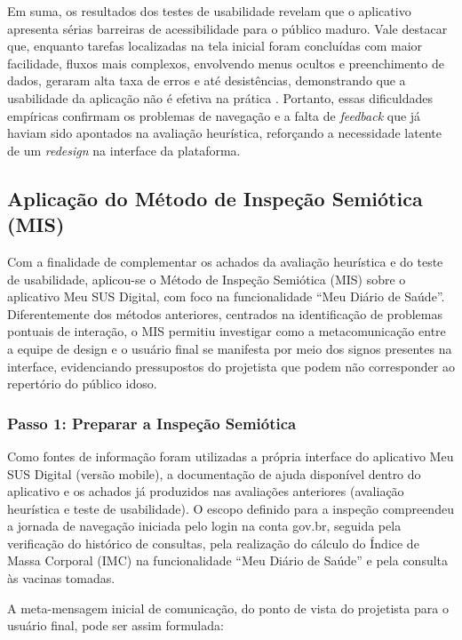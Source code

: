 \documentclass[12pt]{article}
\begin{document}
\begin{abstractp}
Em suma, os resultados dos testes de usabilidade revelam que o aplicativo apresenta sérias barreiras de acessibilidade para o público maduro. Vale destacar que, enquanto tarefas localizadas na tela inicial foram concluídas com maior facilidade, fluxos mais complexos, envolvendo menus ocultos e preenchimento de dados, geraram alta taxa de erros e até desistências, demonstrando que a usabilidade da aplicação não é efetiva na prática \cite{barbosa2010ihc}. Portanto, essas dificuldades empíricas confirmam os problemas de navegação e a falta de \textit{feedback} que já haviam sido apontados na avaliação heurística, reforçando a necessidade latente de um \textit{redesign} na interface da plataforma.

 \subsection{Aplicação do Método de Inspeção Semiótica (MIS)}

Com a finalidade de complementar os achados da avaliação heurística e do teste
de usabilidade, aplicou-se o Método de Inspeção Semiótica (MIS) sobre o
aplicativo Meu SUS Digital, com foco na funcionalidade ``Meu Diário de
Saúde''. Diferentemente dos métodos anteriores, centrados na identificação de
problemas pontuais de interação, o MIS permitiu investigar como a
metacomunicação entre a equipe de design e o usuário final se manifesta por
meio dos signos presentes na interface, evidenciando pressupostos do
projetista que podem não corresponder ao repertório do público idoso.

\subsubsection{Passo 1: Preparar a Inspeção Semiótica}

Como fontes de informação foram utilizadas a própria interface do aplicativo
Meu SUS Digital (versão mobile), a documentação de ajuda disponível dentro do
aplicativo e os achados já produzidos nas avaliações anteriores (avaliação
heurística e teste de usabilidade). O escopo definido para a inspeção
compreendeu a jornada de navegação iniciada pelo login na conta gov.br,
seguida pela verificação do histórico de consultas, pela realização do
cálculo do Índice de Massa Corporal (IMC) na funcionalidade ``Meu Diário de
Saúde'' e pela consulta às vacinas tomadas.

A meta-mensagem inicial de comunicação, do ponto de vista do projetista para
o usuário final, pode ser assim formulada:


\end{abstractp}
\end{document}
